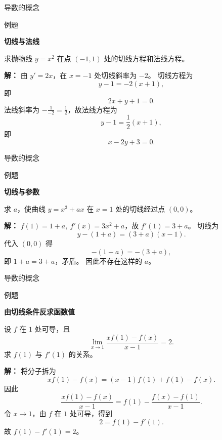 \documentclass[aspectratio=169,10pt,fontset=fandol]{ctexbeamer}
\newenvironment{warning}{\par\noindent\textbf{注：}\quad}{\par\vspace{0.8em}}
\begin{document}
\begin{frame}[t,fragile]{导数的概念}
\small
\begin{block}{例题}
{\small
\textbf{切线与法线}\par

求抛物线 $y=x^2$ 在点 $(-1,1)$ 处的切线方程和法线方程。

}
\end{block}
\pause
{\small
\textbf{解：}
由 $y'=2x$，在 $x=-1$ 处切线斜率为 $-2$。 切线方程为
\[
y-1=-2(x+1),
\]
即
\[
2x+y+1=0.
\]
法线斜率为 $-\frac1{-2}=\frac12$，故法线方程为
\[
y-1=\frac12(x+1),
\]
即
\[
x-2y+3=0.
\]

}
\end{frame}
\begin{frame}[t,fragile]{导数的概念}
\normalsize
\begin{block}{例题}
{\normalsize
\textbf{切线与参数}\par

求 $a$，使曲线 $y=x^3+ax$ 在 $x=1$ 处的切线经过点 $(0,0)$。

}
\end{block}
\pause
{\normalsize
\textbf{解：}
$f(1)=1+a,\ f'(x)=3x^2+a$，故 $f'(1)=3+a$。 切线为
\[
y-(1+a)=(3+a)(x-1).
\]
代入 $(0,0)$ 得
\[
-(1+a)=-(3+a),
\]
即 $1+a=3+a$，矛盾。 因此不存在这样的 $a$。

}
\end{frame}
\begin{frame}[t,fragile]{导数的概念}
\small
\begin{block}{例题}
{\small
\textbf{由切线条件反求函数值}\par

设 $f$ 在 $1$ 处可导，且
\[
\lim_{x\to1}\frac{xf(1)-f(x)}{x-1}=2.
\]
求 $f(1)$ 与 $f'(1)$ 的关系。

}
\end{block}
\pause
{\small
\textbf{解：}
将分子拆为
\[
xf(1)-f(x)=(x-1)f(1)+f(1)-f(x).
\]
因此
\[
\frac{xf(1)-f(x)}{x-1}
=f(1)-\frac{f(x)-f(1)}{x-1}.
\]
令 $x\to1$，由 $f$ 在 $1$ 处可导，得到
\[
2=f(1)-f'(1).
\]
故 $f(1)-f'(1)=2$。

}
\end{frame}
\end{document}
